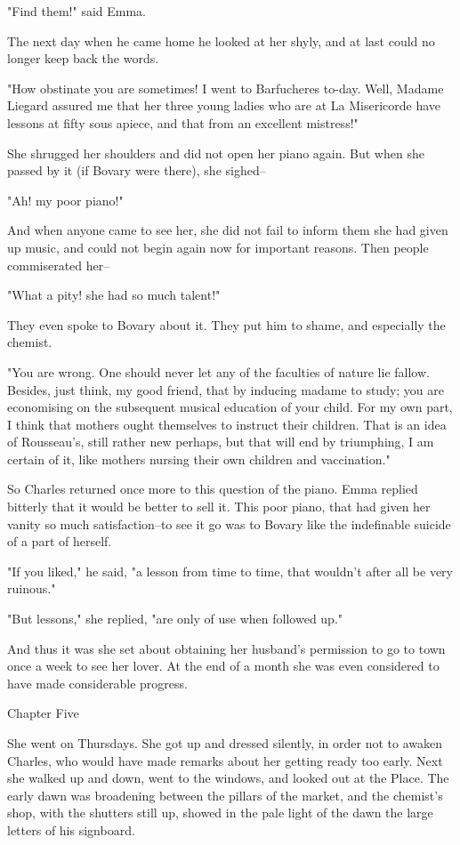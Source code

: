 \documentclass{tufte-book}
\begin{document}
"Find them!" said Emma.

The next day when he came home he looked at her shyly, and at last could
no longer keep back the words.

"How obstinate you are sometimes! I went to Barfucheres to-day. Well,
Madame Liegard assured me that her three young ladies who are at
La Misericorde have lessons at fifty sous apiece, and that from an
excellent mistress!"

She shrugged her shoulders and did not open her piano again. But when
she passed by it (if Bovary were there), she sighed--

"Ah! my poor piano!"

And when anyone came to see her, she did not fail to inform them she
had given up music, and could not begin again now for important reasons.
Then people commiserated her--

"What a pity! she had so much talent!"

They even spoke to Bovary about it. They put him to shame, and
especially the chemist.

"You are wrong. One should never let any of the faculties of nature lie
fallow. Besides, just think, my good friend, that by inducing madame to
study; you are economising on the subsequent musical education of
your child. For my own part, I think that mothers ought themselves to
instruct their children. That is an idea of Rousseau's, still rather
new perhaps, but that will end by triumphing, I am certain of it, like
mothers nursing their own children and vaccination."

So Charles returned once more to this question of the piano. Emma
replied bitterly that it would be better to sell it. This poor piano,
that had given her vanity so much satisfaction--to see it go was to
Bovary like the indefinable suicide of a part of herself.

"If you liked," he said, "a lesson from time to time, that wouldn't
after all be very ruinous."

"But lessons," she replied, "are only of use when followed up."

And thus it was she set about obtaining her husband's permission to go
to town once a week to see her lover. At the end of a month she was even
considered to have made considerable progress.



Chapter Five

She went on Thursdays. She got up and dressed silently, in order not to
awaken Charles, who would have made remarks about her getting ready too
early. Next she walked up and down, went to the windows, and looked out
at the Place. The early dawn was broadening between the pillars of the
market, and the chemist's shop, with the shutters still up, showed in
the pale light of the dawn the large letters of his signboard.
\end{document}
